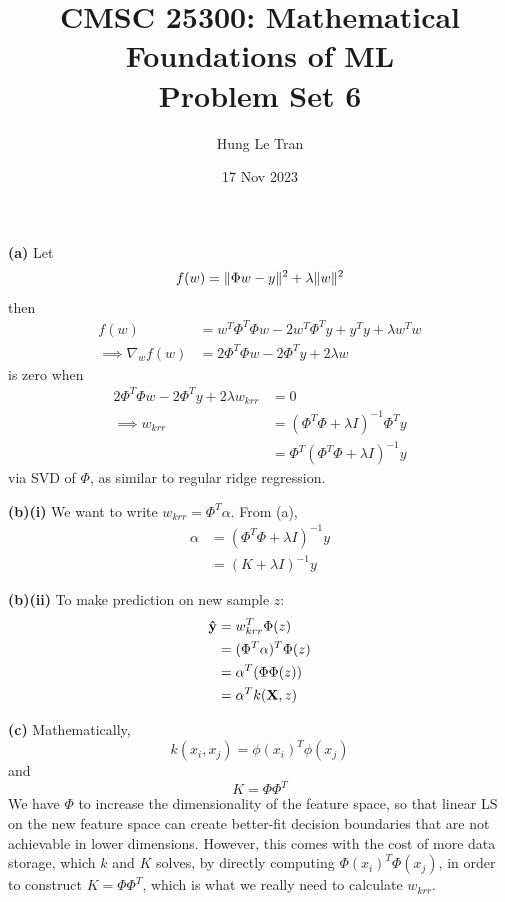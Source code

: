 \documentclass[a4paper, 12pt]{article}
\title{CMSC 25300: Mathematical Foundations of ML \\ \large Problem Set 6}
\date{17 Nov 2023}
\author{Hung Le Tran}
\begin{document}
\maketitle
\setcounter{section}{6}
\begin{problem} [Problem 1]
\end{problem}
\begin{solution}
    \textbf{(a)}
    Let \[
    f(w) = \lVert\Phi w - y\rVert^2 + \lambda \lVert w\rVert^2 
    \]
    then \begin{align*}
        f(w) &= w^T \Phi^T \Phi w - 2 w^T \Phi^T y + y^T y + \lambda w^T w\\
        \implies \nabla_w f(w) &= 2\Phi^T \Phi w - 2\Phi^T y + 2\lambda w
    \end{align*}
    is zero when \begin{align*}
        2\Phi^T \Phi w - 2\Phi^T y + 2\lambda w_{krr} & = 0 \\
        \implies w_{krr} &= (\Phi^T \Phi + \lambda I)^{-1}\Phi^T y \\
        &= \Phi^T (\Phi^T \Phi + \lambda I)^{-1} y
    \end{align*}
    via SVD of $\Phi$, as similar to regular ridge regression.

    \textbf{(b)(i)}    We want to write $w_{krr} = \Phi^T \alpha$.  From (a), \begin{align}
        \alpha &= (\Phi^T \Phi + \lambda I)^{-1} y \\
        &= (K + \lambda I)^{-1}y
    \end{align}

    \textbf{(b)(ii)} To make prediction on new sample $z$: 
    \begin{align*}
        \mathbf{\hat{y}} &= w^T_{krr}\Phi(z) \\
        &= (\Phi^T \alpha)^T \Phi(z) \\
        &= \alpha^T (\Phi \Phi(z)) \\
        &= \alpha^T k(\mathbf{X}, z) \\
    \end{align*}

    \textbf{(c)} Mathematically, \[
    k(x_i, x_j) = \phi(x_i)^T \phi(x_j)
    \]
    and \[
    K = \Phi \Phi^T
    \]
    We have $\Phi$ to increase the dimensionality of the feature space, so that linear LS on the new feature space can create better-fit decision boundaries that are not achievable in lower dimensions. However, this comes with the cost of more data storage, which $k$ and $K$ solves, by directly computing $\Phi(x_i)^T \Phi(x_j)$, in order to construct $K = \Phi\Phi^T$, which is what we really need to calculate $w_{krr}$.


\end{solution}
\end{document}
